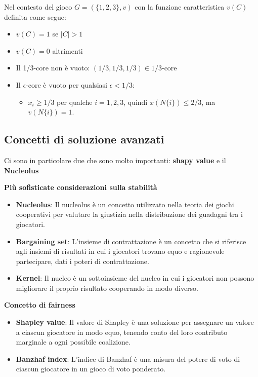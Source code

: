 Nel contesto del gioco $G = (\{1, 2, 3\}, v)$ con la funzione caratteristica
$v(C)$ definita come segue:
\begin{itemize}
    \item $v(C) = 1$ se $|C| > 1$
    \item $v(C) = 0$ altrimenti
\end{itemize}

\begin{itemize}
    \item Il 1/3-core non è vuoto: $(1/3, 1/3, 1/3) \in 1/3$-core
    \item Il $\epsilon$-core è vuoto per qualsiasi $\epsilon < 1/3$:
          \begin{itemize}
              \item $x_i \geq 1/3$ per qualche $i = 1, 2, 3$, quindi $x(N\{i\}) \leq 2/3$, ma $v(N\{i\}) = 1$.
          \end{itemize}
\end{itemize}

\subsection{Concetti di soluzione avanzati}
Ci sono in particolare due che sono molto importanti: \textbf{shapy value} e il
\textbf{Nucleolus}

\textbf{Più sofisticate considerazioni sulla stabilità}
\begin{itemize}
    \item \textbf{Nucleolus}: Il nucleolus è un concetto utilizzato nella teoria dei giochi cooperativi per valutare la giustizia nella distribuzione dei guadagni tra i giocatori.
    \item \textbf{Bargaining set}: L'insieme di contrattazione è un concetto che si riferisce agli insiemi di risultati in cui i giocatori trovano equo e ragionevole partecipare, dati i poteri di contrattazione.
    \item \textbf{Kernel}: Il nucleo è un sottoinsieme del nucleo in cui i giocatori non possono migliorare il proprio risultato cooperando in modo diverso.
\end{itemize}

\textbf{Concetto di fairness}
\begin{itemize}
    \item \textbf{Shapley value}: Il valore di Shapley è una soluzione per assegnare un valore a ciascun giocatore in modo equo, tenendo conto del loro contributo marginale a ogni possibile coalizione.
    \item \textbf{Banzhaf index}: L'indice di Banzhaf è una misura del potere di voto di ciascun giocatore in un gioco di voto ponderato.
\end{itemize}

